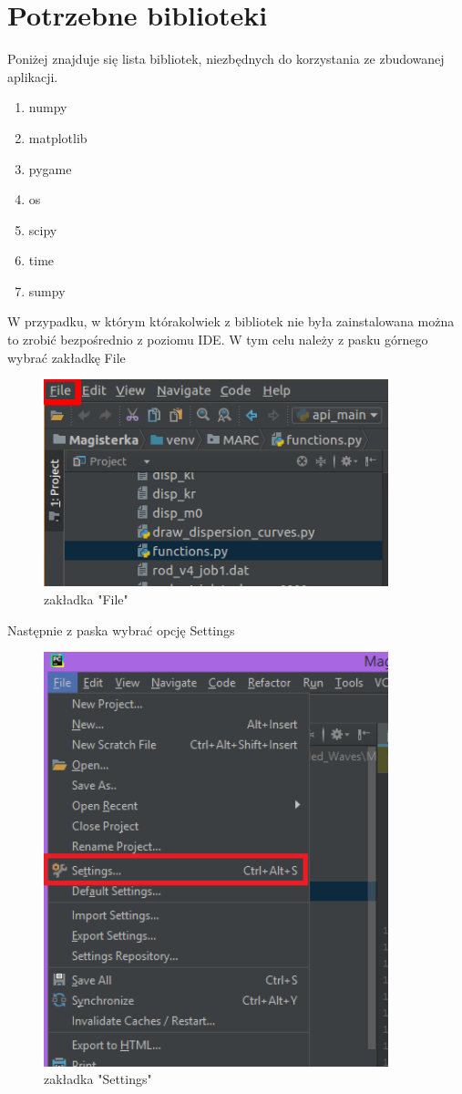 \section{Potrzebne biblioteki}

Poniżej znajduje się lista bibliotek, niezbędnych do korzystania ze zbudowanej aplikacji.

\begin{enumerate}
\item numpy
\item matplotlib
\item pygame
\item os
\item scipy
\item time
\item sumpy
\end{enumerate}

W przypadku, w którym którakolwiek z bibliotek nie była zainstalowana można to zrobić bezpośrednio z poziomu IDE. W tym celu należy z pasku górnego wybrać zakładkę File

\begin{figure}[h]
\centering
\includegraphics[width=10cm]{Zdjecia/5/kasia/file2}
\caption{zakładka "File"}
\label{fig:file}
\end{figure}

Następnie z paska wybrać opcję Settings

\begin{figure}[h]
\centering
\includegraphics[width=10cm]{Zdjecia/5/kasia/settingsA}
\caption{zakładka "Settings"}
\label{fig:file}
\end{figure}


